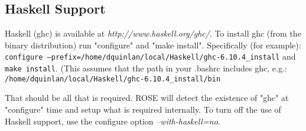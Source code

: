 

\subsection{Haskell Support}
   Haskell (ghc) is available at {\it http://www.haskell.org/ghc/}.
To install ghc (from the binary distribution) run "configure" and 
"make install". Specifically (for example): \\
{\tt configure --prefix=/home/dquinlan/local/Haskell/ghc-6.10.4\_install}
and
{\tt make install}.
(This assumes that the path in your .bashrc includes ghc, e.g.: \\
   {\tt /home/dquinlan/local/Haskell/ghc-6.10.4\_install/bin}

That should be all that is required.  ROSE will detect
the existence of "ghc" at "configure" time and setup
what is required internally.  To turn off the use of Haskell support, 
use the configure option {\em --with-haskell=no}.

